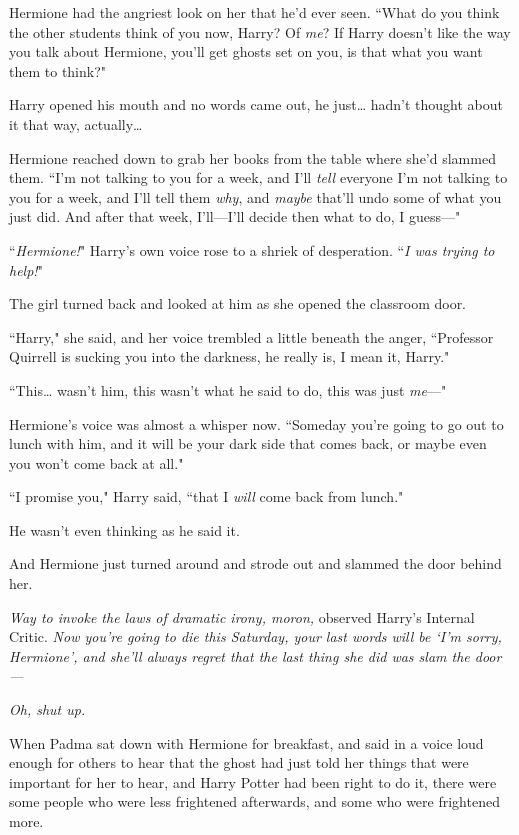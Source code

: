 Hermione had the angriest look on her that he'd ever seen. ``What do you think the other students think of you now, Harry? Of \emph{me}? If Harry doesn't like the way you talk about Hermione, you'll get ghosts set on you, is that what you want them to think?"

Harry opened his mouth and no words came out, he just{\ldots} hadn't thought about it that way, actually{\ldots}

Hermione reached down to grab her books from the table where she'd slammed them. ``I'm not talking to you for a week, and I'll \emph{tell} everyone I'm not talking to you for a week, and I'll tell them \emph{why}, and \emph{maybe} that'll undo some of what you just did. And after that week, I'll—I'll decide then what to do, I guess—"

``\emph{Hermione!}" Harry's own voice rose to a shriek of desperation. ``\emph{I was trying to help!}"

The girl turned back and looked at him as she opened the classroom door.

``Harry," she said, and her voice trembled a little beneath the anger, ``Professor Quirrell is sucking you into the darkness, he really is, I mean it, Harry."

``This{\ldots} wasn't him, this wasn't what he said to do, this was just \emph{me}—"

Hermione's voice was almost a whisper now. ``Someday you're going to go out to lunch with him, and it will be your dark side that comes back, or maybe even you won't come back at all."

``I promise you," Harry said, ``that I \emph{will} come back from lunch."

He wasn't even thinking as he said it.

And Hermione just turned around and strode out and slammed the door behind her.

\emph{Way to invoke the laws of dramatic irony, moron,} observed Harry's Internal Critic. \emph{Now you're going to die this Saturday, your last words will be `I'm sorry, Hermione', and she'll always regret that the last thing she did was slam the door—}

\emph{Oh, shut up.}

\later

When Padma sat down with Hermione for breakfast, and said in a voice loud enough for others to hear that the ghost had just told her things that were important for her to hear, and Harry Potter had been right to do it, there were some people who were less frightened afterwards, and some who were frightened more.

